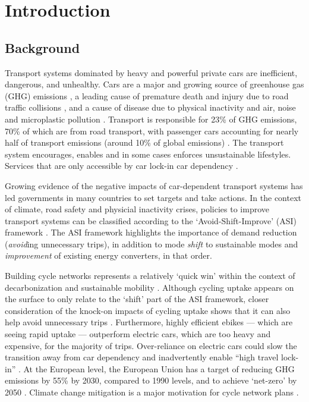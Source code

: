 \documentclass[
  super,
  preprint,
  3p]{elsarticle}
\begin{document}
\newpage{}

\section{Introduction}\label{introduction}

\subsection{Background}\label{background}

Transport systems dominated by heavy and powerful private cars are
inefficient, dangerous, and unhealthy. Cars are a major and growing
source of greenhouse gas (GHG) emissions \citep{winkler2023}, a leading
cause of premature death and injury due to road traffic collisions
\citep{globals2018}, and a cause of disease due to physical inactivity
and air, noise and microplastic pollution \citep{mattsson2023}
\citep{welch2023} \citep{cavallaro2024}. Transport is responsible for
23\% of GHG emissions, 70\% of which are from road transport, with
passenger cars accounting for nearly half of transport emissions (around
10\% of global emissions) \citep{jaramillo2022}. The transport system
encourages, enables and in some cases enforces unsustainable lifestyles.
Services that are only accessible by car lock-in car dependency
\citep{gray2001, shergold2012, motte-baumvol2010}.

Growing evidence of the negative impacts of car-dependent transport
systems has led governments in many countries to set targets and take
actions. In the context of climate, road safety and physicial inactivity
crises, policies to improve transport systems can be classified
according to the `Avoid-Shift-Improve' (ASI) framework
\citep{jaramillo2022}. The ASI framework highlights the importance of
demand reduction (\emph{avoid}ing unnecessary trips), in addition to
mode \emph{shift} to sustainable modes and \emph{improvement} of
existing energy converters, in that order.

Building cycle networks represents a relatively `quick win' within the
context of decarbonization \citep{brand2020} and sustainable mobility
\citep{burns2013}. Although cycling uptake appears on the surface to
only relate to the `shift' part of the ASI framework, closer
consideration of the knock-on impacts of cycling uptake shows that it
can also help avoid unnecessary trips \citep{nello-deakin2020}.
Furthermore, highly efficient ebikes --- which are seeing rapid uptake
--- outperform electric cars, which are too heavy and expensive, for the
majority of trips. Over-reliance on electric cars could slow the
transition away from car dependency and inadvertently enable ``high
travel lock-in'' \citep{anable2019}. At the European level, the European
Union has a target of reducing GHG emissions by 55\% by 2030, compared
to 1990 levels, and to achieve `net-zero' by 2050 \citep{rosenow2022}.
Climate change mitigation is a major motivation for cycle network plans
\citep{scappini2022}.
\end{document}
